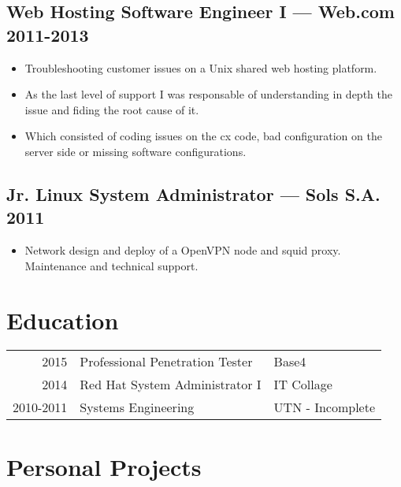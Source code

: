 \documentclass[11pt]{article}
\begin{document}
\subsection{Web Hosting Software Engineer I --- Web.com \hfill 2011-2013}
\begin{itemize}
  \setlength{\parskip}{0pt}
  \setlength{\itemsep}{0pt plus 1pt}
\item Troubleshooting customer issues on a Unix shared web hosting platform.
\item As the last level of support I was responsable of understanding in depth the issue and fiding the root cause of it.
\item Which consisted of coding issues on the cx code, bad configuration on the server side or missing software configurations.
\end{itemize}

\subsection{Jr. Linux System Administrator --- Sols S.A. \hfill 2011}
\begin{itemize}
  \setlength{\parskip}{0pt}
  \setlength{\itemsep}{0pt plus 1pt}
\item Network design and deploy of a OpenVPN node and squid proxy. Maintenance and technical support.
\end{itemize}


\section{Education}


\begin{center}
\begin{tabular}{@{}r|p{}|l}
  \hspace{.1em} 2015      & Professional Penetration Tester & {Base4} \\
  \hspace{.1em} 2014      & Red Hat System Administrator I  & {IT Collage} \\
  \hspace{.1em} 2010-2011 & Systems Engineering             & {UTN - Incomplete}
\end{tabular}
\end{center}


\section{Personal Projects}
\end{document}
